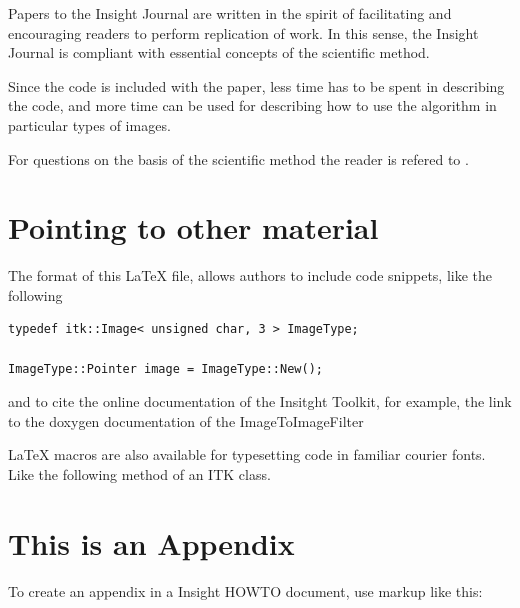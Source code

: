 \documentclass{InsightArticle}
\begin{document}
Papers to the Insight Journal are written in the spirit of facilitating and
encouraging readers to perform replication of work. In this sense, the Insight
Journal is compliant with essential concepts of the scientific method.

Since the code is included with the paper, less time has to be spent in
describing the code, and more time can be used for describing how to use the
algorithm in particular types of images.

For questions on the basis of the scientific method the reader is refered to
\cite{Popper2002,Popper1971}.



\section{Pointing to other material}

The format of this LaTeX file, allows authors to include code snippets, like
the following

\small
\begin{verbatim}
typedef itk::Image< unsigned char, 3 > ImageType;

ImageType::Pointer image = ImageType::New();
\end{verbatim}
\normalsize

and to cite the online documentation of the Insitght Toolkit, for example, the
link to the doxygen documentation of the ImageToImageFilter


LaTeX macros are also available for typesetting code in familiar courier fonts.
Like the following method of an ITK class.







\appendix

\section{This is an Appendix}

To create an appendix in a Insight HOWTO document, use markup like
this:
\end{document}

